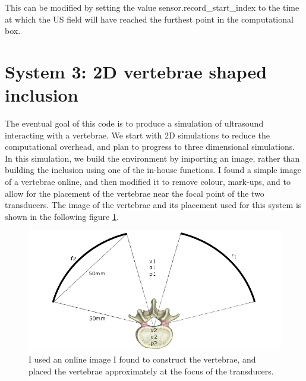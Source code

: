 \documentclass[10pt,a4paper]{article}
\begin{document}
This can be modified by setting the value sensor.record\_start\_index to the time at which the US field will have reached the furthest point in the computational box. 


\section{System 3: 2D vertebrae shaped inclusion}

The eventual goal of this code is to produce a simulation of ultrasound interacting with a vertebrae. We start with 2D simulations to reduce the computational overhead, and plan to progress to three dimensional simulations. In this simulation, we build the environment by importing an image, rather than building the inclusion using one of the in-house functions. I found a simple image of a vertebrae online, and then modified it to remove colour, mark-ups, and to allow for the placement of the vertebrae near the focal point of the two transducers. The image of the vertebrae and its placement used for this system is shown in the following figure \ref{vertebra}.

\begin{figure}[H]\label{vertebra}
\centering
\includegraphics[scale=0.5]{setup3}
\caption{I used an online image I found to construct the vertebrae, and placed the vertebrae approximately at the focus of the transducers.}
\end{figure}



\newpage
{}

\end{document}
